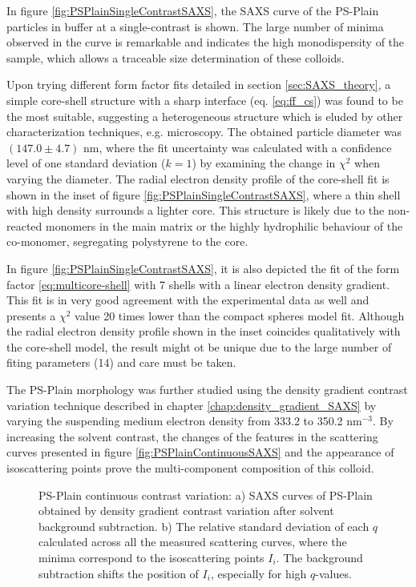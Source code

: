 In figure \ref{fig:PSPlainSingleContrastSAXS}, the SAXS curve of the  PS-Plain particles in buffer at a single-contrast is shown. The large number of minima observed in the curve is remarkable and indicates the high monodispersity of the sample, which allows a traceable size determination of these colloids.

Upon trying different form factor fits detailed in section \ref{sec:SAXS_theory}, a simple core-shell structure with a sharp interface (eq. \ref{eq:ff_cs}) was found to be the most suitable, suggesting a heterogeneous structure which is eluded by other characterization techniques, e.g. microscopy. The obtained particle diameter was $(147.0\pm4.7)$ nm, where the fit uncertainty was calculated with a confidence level of one standard deviation ($k=1$) by examining the change in $\chi^2$ when varying the diameter. The radial electron density profile of the core-shell fit is shown in the inset of figure \ref{fig:PSPlainSingleContrastSAXS}, where a thin shell with high density surrounds a lighter core. This structure is likely due to the non-reacted monomers in the main matrix or the highly hydrophilic behaviour of the co-monomer, segregating polystyrene to the core.

In figure \ref{fig:PSPlainSingleContrastSAXS}, it is also depicted the fit of the form factor \ref{eq:multicore-shell} with 7 shells with a linear electron density gradient. This fit is in very good agreement with the experimental data as well and presents a $\chi^2$ value 20 times lower than the compact spheres model fit. Although the radial electron density profile shown in the inset coincides qualitatively with the core-shell model, the result might ot be unique due to the large number of fiting parameters (14) and care must be taken.

The PS-Plain morphology was further studied using the density gradient contrast variation technique described in chapter \ref{chap:density_gradient_SAXS} by varying the suspending medium electron density from 333.2 to 350.2 nm$^{-3}$. By increasing the solvent contrast, the changes of the features in the scattering curves presented in figure \ref{fig:PSPlainContinuousSAXS} and the appearance of isoscattering points prove the multi-component composition of this colloid.

\begin{figure}%
	\centering
	\caption{PS-Plain continuous contrast variation: a) SAXS curves of PS-Plain obtained by density gradient contrast variation after solvent background subtraction. b) The relative standard
deviation of each $q$ calculated across all the measured scattering curves, where the minima correspond to the isoscattering points $I_i$. The background subtraction shifts the position of $I_i$, especially for high $q$-values.}
\end{figure}

